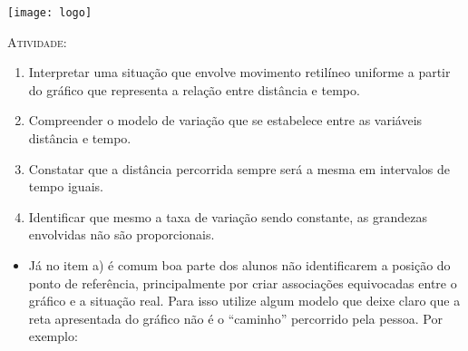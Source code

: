 \documentclass[10 pt,usenames,dvipsnames, oneside]{article}
\begin{document}
\begin{center}
  \begin{minipage}[l]{3cm}
\texttt{[image: logo]}    
\end{minipage}\hfill
\begin{minipage}[r]{.8\textwidth}
 {\Large \scshape Atividade: }  
\end{minipage}
\end{center}
\vspace{.2cm}

\ifdefined\prof
\begin{objetivos}
\item \phantom{a}
\end{objetivos}

\begin{goals}
\begin{enumerate}

\item Interpretar uma situação que envolve movimento retilíneo uniforme a partir do gráfico que representa a relação entre distância e tempo.
\item Compreender o modelo de variação que se estabelece entre as variáveis distância e tempo.
\item Constatar que a distância percorrida sempre será a mesma em intervalos de tempo iguais.
\item Identificar que mesmo a taxa de variação sendo constante, as grandezas envolvidas não são proporcionais.
\end{enumerate}


\tcblower


\begin{itemize}
\item Já no item a) é comum boa parte dos alunos não identificarem a posição do ponto de referência, principalmente por criar associações equivocadas entre o gráfico e a situação real. Para isso utilize algum modelo que deixe claro que a reta apresentada do gráfico não é o “caminho” percorrido pela pessoa. Por exemplo:

\begin{figure}[H]
\centering

\end{figure}
\end{itemize}
\end{goals}
\end{document}
